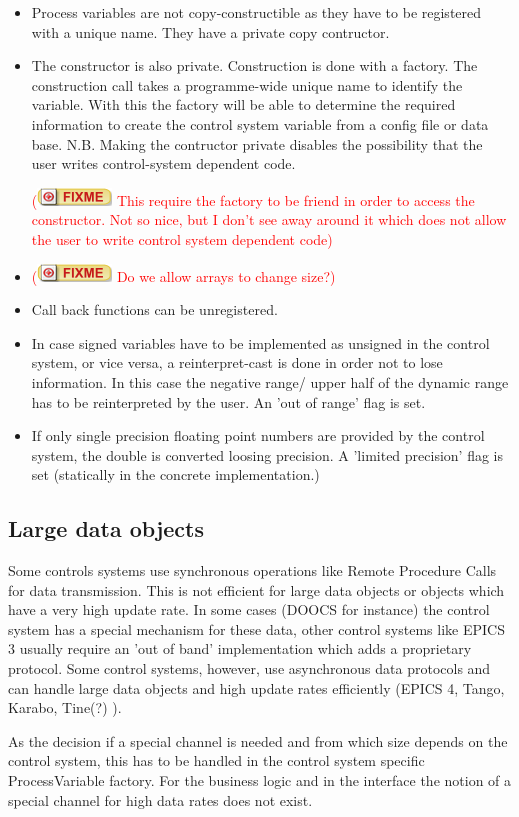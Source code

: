 \documentclass[11pt,a4paper]{scrartcl}
\newcounter{nFixmes}
\newcommand{\fixme}[1]{\addtocounter{nFixmes}{1}\textcolor{red}{(\includegraphics[height=2ex]{fixme} #1)}\xspace}
\begin{document}
\begin{itemize}
\item Process variables are not copy-constructible as they have to be registered with a unique name. They have a private copy contructor.
\item The constructor is also private. Construction is done with a factory. The construction call takes a programme-wide unique name to identify the variable. With this the factory will be able to determine the required information to create the control system variable from a config file or data base.
N.B. Making the contructor private disables the possibility that the user writes control-system dependent code.
\fixme{This require the factory to be friend in order to access the constructor. Not so nice, but I don't see away around it which does not allow the user to write control system dependent code}
\item \fixme{Do we allow arrays to change size?}
\item Call back functions can be unregistered.
\item In case signed variables have to be implemented as unsigned in the control system, or vice versa, a reinterpret-cast is done in order not to lose information. In this case the negative range/ upper half of the dynamic range has to be reinterpreted by the user. An 'out of range' flag is set.
\item If only single precision floating point numbers are provided by the control system, the double is converted loosing precision. A 'limited precision' flag is set (statically in the concrete implementation.)
\end{itemize}

\subsection{Large data objects}

Some controls systems use synchronous operations like Remote Procedure Calls for data transmission. This is not efficient for large data objects or objects which have a very high update rate. In some cases (DOOCS for instance) the control system has a special mechanism for these data, other control systems like EPICS 3 usually require an 'out of band' implementation which adds a proprietary protocol. Some control systems, however, use asynchronous data protocols and can handle large data objects and high update rates efficiently (EPICS 4, Tango, Karabo, Tine(?) ).

As the decision if a special channel is needed and from which size depends on the control system, this has to be handled in the control system specific ProcessVariable factory. For the business logic and in the interface the notion of a special channel for high data rates does not exist.
\end{document}
